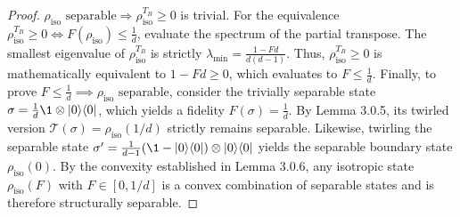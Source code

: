 \begin{proof}
$\rho_{\text{iso}} \text{ separable} \Rightarrow \rho_{\text{iso}}^{T_B} \ge 0$ is trivial. For the equivalence $\rho_{\text{iso}}^{T_B} \ge 0 \iff F(\rho_{\text{iso}}) \le \frac{1}{d}$, evaluate the spectrum of the partial transpose. The smallest eigenvalue of $\rho_{\text{iso}}^{T_B}$ is strictly $\lambda_{\min} = \frac{1 - Fd}{d(d-1)}$. Thus, $\rho_{\text{iso}}^{T_B} \ge 0$ is mathematically equivalent to $1 - Fd \ge 0$, which evaluates to $F \le \frac{1}{d}$. Finally, to prove $F \le \frac{1}{d} \implies \rho_{\text{iso}} \text{ separable}$, consider the trivially separable state $\sigma = \frac{1}{d} \1 \otimes \ket{0}\bra{0}$, which yields a fidelity $F(\sigma) = \frac{1}{d}$. By Lemma 3.0.5, its twirled version $\mathcal{T}(\sigma) = \rho_{\text{iso}}(1/d)$ strictly remains separable. Likewise, twirling the separable state $\sigma' = \frac{1}{d-1} (\1 - \ket{0}\bra{0}) \otimes \ket{0}\bra{0}$ yields the separable boundary state $\rho_{\text{iso}}(0)$. By the convexity established in Lemma 3.0.6, any isotropic state $\rho_{\text{iso}}(F)$ with $F \in [0, 1/d]$ is a convex combination of separable states and is therefore structurally separable.
\end{proof}

